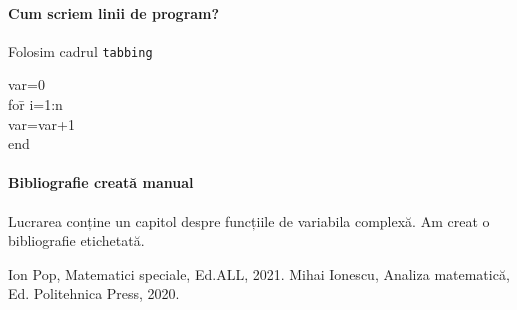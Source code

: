 \documentclass{article}
\begin{document}
\paragraph{Cum scriem linii de program?}
Folosim cadrul \verb+tabbing+
\begin{tabbing}
var=0\\
fo\= r i=1:n\\
\> var=var+1 %
\\
end
\end{tabbing}
\paragraph{Bibliografie creată manual}
Lucrarea \cite{aut} conține un capitol despre funcțiile de variabila complexă. Am creat o bibliografie etichetată.
\begin{thebibliography}{aaaaaaaaaa}
 Ion Pop, Matematici speciale, Ed.ALL, 2021.
 Mihai Ionescu, Analiza matematică, Ed. Politehnica Press, 2020.
\end{thebibliography}
\end{document}
